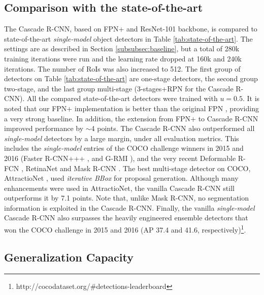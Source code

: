 \documentclass[10pt,twocolumn,letterpaper]{article}
\begin{document}
\subsection{Comparison with the state-of-the-art}
\label{subsec:state-of-the-art}


The Cascade R-CNN, based on FPN+ and ResNet-101 backbone, is compared to state-of-the-art \emph{single-model} object detectors in Table \ref{tab:state-of-the-art}. The settings are as described in
Section \ref{subsubsec:baseline}, but a total of 280k training
iterations were run and the learning rate dropped at 160k and 240k
iterations. The number of RoIs was also increased to 512. The first group
of detectors on Table \ref{tab:state-of-the-art} are one-stage detectors,
the second group two-stage, and the last group multi-stage
(3-stages+RPN for the Cascade R-CNN). All the compared state-of-the-art detectors were trained with $u=0.5$. It is noted that our FPN+ implementation is
better than the original FPN \cite{lin2017feature}, providing a very strong
baseline. In addition, the extension from FPN+ to Cascade R-CNN improved
performance by $\sim$4 points. The Cascade R-CNN also outperformed
all \emph{single-model} detectors by a large margin, under all evaluation metrics. This includes the \emph{single-model} entries of the COCO challenge winners in 2015 and 2016 (Faster R-CNN+++ \cite{DBLP:conf/cvpr/HeZRS16},
and G-RMI \cite{DBLP:journals/corr/HuangRSZKFFWSG016}), and the very recent
Deformable R-FCN \cite{dai2017deformable}, RetinaNet \cite{lin2017focal}
and Mask R-CNN \cite{he2017mask}. The best multi-stage detector on COCO,
AttractioNet \cite{DBLP:conf/bmvc/GidarisK16}, used \textit{iterative BBox} for proposal generation. Although many enhancements were used in AttractioNet, the vanilla Cascade R-CNN still outperforms it by 7.1 points. Note that, unlike Mask R-CNN, no segmentation information is exploited in the Cascade R-CNN. Finally, the vanilla \emph{single-model} Cascade R-CNN also surpasses the heavily engineered ensemble detectors that won the COCO challenge in 2015 and 2016 (AP 37.4 and 41.6, respectively)\footnote{http://cocodataset.org/\#detections-leaderboard}.

\subsection{Generalization Capacity}
\end{document}
